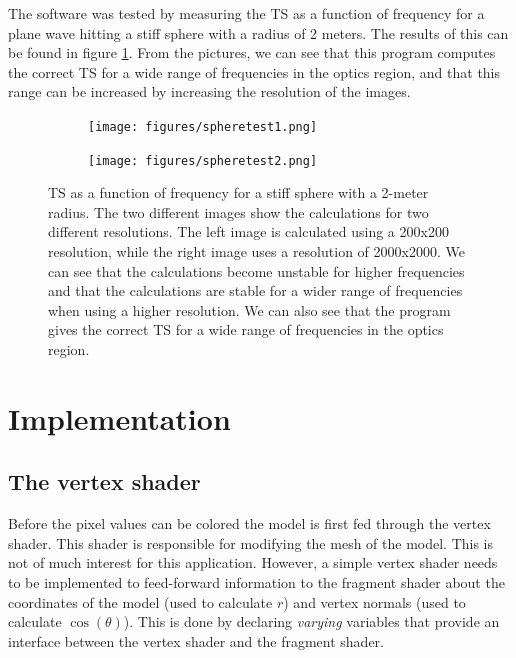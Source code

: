 \documentclass[a4paper, 11pt]{article}
\begin{document}
    The software was tested by measuring the TS as a function of frequency for a plane wave hitting a stiff sphere with a radius of 2 meters. The results of this can be found in figure \ref{fig:sphere_test}. From the pictures, we can see that this program computes the correct TS for a wide range of frequencies in the optics region, and that this range can be increased by increasing the resolution of the images. 
    \begin{figure}
        \centering
        \begin{subfigure}{0.45\textwidth}
            \texttt{[image: figures/spheretest1.png]}
        \end{subfigure}
        \begin{subfigure}{0.45\textwidth}
            \texttt{[image: figures/spheretest2.png]}
        \end{subfigure}
        \caption{TS as a function of frequency for a stiff sphere with a 2-meter radius. The two different images show the calculations for two different resolutions. The left image is calculated using a 200x200 resolution, while the right image uses a resolution of 2000x2000. We can see that the calculations become unstable for higher frequencies and that the calculations are stable for a wider range of frequencies when using a higher resolution. We can also see that the program gives the correct TS for a wide range of frequencies in the optics region.}
        \label{fig:sphere_test}
    \end{figure} 

\section{Implementation}
    

    \subsection{The vertex shader}
        
        Before the pixel values can be colored the model is first fed through the vertex shader. This shader is responsible for modifying the mesh of the model. This is not of much interest for this application. However, a simple vertex shader needs to be implemented to feed-forward information to the fragment shader about the coordinates of the model (used to calculate $r$) and vertex normals (used to calculate $\cos(\theta)$). This is done by declaring \textit{varying} variables that provide an interface between the vertex shader and the fragment shader. 
\end{document}
